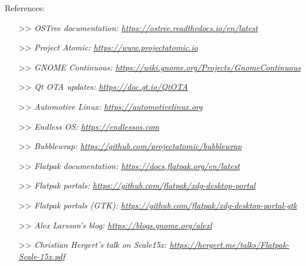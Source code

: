 %
%
%
\begin{frame}
  References:\vspacing
  \begin{tiny}
    \begin{itemize}
    \item[>>] \textit{OSTree documentation: \url{https://ostree.readthedocs.io/en/latest}}\vspacing
    \item[>>] \textit{Project Atomic: \url{https://www.projectatomic.io}}\vspacing
    \item[>>] \textit{GNOME Continuous: \url{https://wiki.gnome.org/Projects/GnomeContinuous}}\vspacing
    \item[>>] \textit{Qt OTA updates: \url{https://doc.qt.io/QtOTA}}\vspacing
    \item[>>] \textit{Automotive Linux: \url{https://automotivelinux.org}}\vspacing
    \item[>>] \textit{Endless OS: \url{https://endlessos.com}}\vspacing
    \item[>>] \textit{Bubblewrap: \url{https://github.com/projectatomic/bubblewrap}}\vspacing
    \item[>>] \textit{Flatpak documentation: \url{https://docs.flatpak.org/en/latest}}\vspacing
    \item[>>] \textit{Flatpak portals: \url{https://github.com/flatpak/xdg-desktop-portal}}\vspacing
    \item[>>] \textit{Flatpak portals (GTK): \url{https://github.com/flatpak/xdg-desktop-portal-gtk}}\vspacing
    \item[>>] \textit{Alex Larsson's blog: \url{https://blogs.gnome.org/alexl}}\vspacing
    \item[>>] \textit{Christian Hergert's talk on Scale15x: \url{https://hergert.me/talks/Flatpak-Scale-15x.pdf}}
    \end{itemize}
  \end{tiny}
\end{frame}
